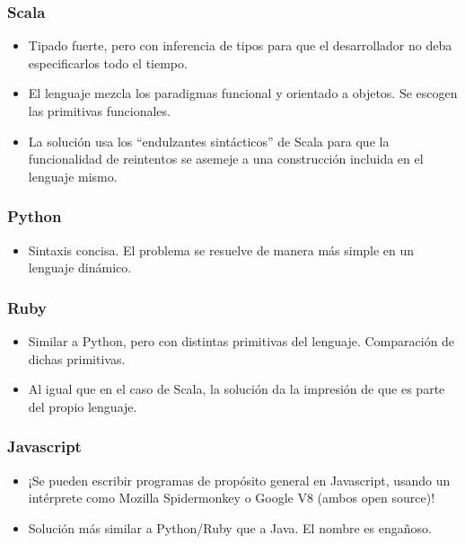\subsubsection*{Scala}

\begin{itemize}
\item Tipado fuerte, pero con inferencia de tipos para que el desarrollador no
  deba especificarlos todo el tiempo.
\item El lenguaje mezcla los paradigmas funcional y orientado a objetos. Se
  escogen las primitivas funcionales.
\item La solución usa los ``endulzantes sintácticos'' de Scala para que la
  funcionalidad de reintentos se asemeje a una construcción incluida en el
  lenguaje mismo.
\end{itemize}

\subsubsection*{Python}

\begin{itemize}
\item Sintaxis concisa. El problema se resuelve de manera más simple en un
  lenguaje dinámico.
\end{itemize}

\subsubsection*{Ruby}

\begin{itemize}
\item Similar a Python, pero con distintas primitivas del lenguaje. Comparación
  de dichas primitivas.
\item Al igual que en el caso de Scala, la solución da la impresión de que es
  parte del propio lenguaje.
\end{itemize}

\subsubsection*{Javascript}

\begin{itemize}
\item ¡Se pueden escribir programas de propósito general en Javascript, usando
  un intérprete como Mozilla Spidermonkey o Google V8 (ambos open source)!
\item Solución más similar a Python/Ruby que a Java. El nombre es engañoso.
\end{itemize}

